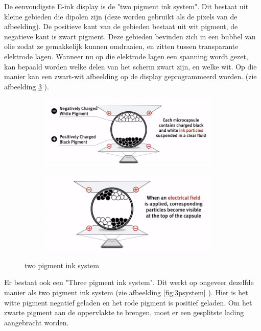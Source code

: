 \documentclass[a4paper,kul]{kulakarticle} %
\begin{document}
De eenvoudigste E-ink display is de "two pigment ink system". Dit bestaat uit kleine gebieden die dipolen zijn (deze worden gebruikt als de pixels van de afbeelding). De positieve kant van de gebieden bestaat uit wit pigment, de negatieve kant is zwart pigment. Deze gebieden bevinden zich in een bubbel van olie zodat ze gemakkelijk kunnen omdraaien, en zitten tussen transparante elektrode lagen. Wanneer nu op die elektrode lagen een spanning wordt gezet, kan bepaald worden welke delen van het scherm zwart zijn, en welke wit. Op die manier kan een zwart-wit afbeelding op de display geprogrammeerd worden. (zie afbeelding \ref{fig:2psystem} ).

\begin{figure}[h]
	\centering
	\begin{subfigure}{.5\textwidth}
		\centering
		\includegraphics[width=0.95\textwidth]{Two_pigment_ink_system1}
		\label{fig:sub2psystem}
	\end{subfigure}%
	\begin{subfigure}{.5\textwidth}
		\centering
		\includegraphics[width=0.95\textwidth]{Two_pigment_ink_system2}
		\label{fig:sub2psystem2}
	\end{subfigure}
	\caption{two pigment ink system}
	\label{fig:2psystem}
\end{figure}

Er bestaat ook een "Three pigment ink system". Dit werkt op ongeveer dezelfde manier als two pigment ink system (zie afbeelding \ref{fig:3psystem} ). Hier is het witte pigment negatief geladen en het rode pigment is positief geladen. Om het zwarte pigment aan de oppervlakte te brengen, moet er een gesplitste lading aangebracht worden.
\end{document}
